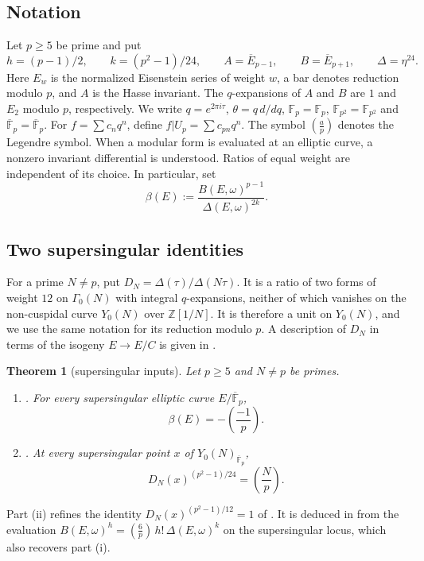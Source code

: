 \documentclass[11pt,a4paper]{article}
\numberwithin{equation}{section}
\newtheorem{theorem}{Theorem}[section]
\theoremstyle{definition}
\theoremstyle{remark}
\newcommand{\Fp}{\mathbb F_p}
\newcommand{\Fq}{\mathbb F_{p^2}}
\newcommand{\Fb}{\overline{\mathbb F}_p}
\newcommand{\Z}{\mathbb Z}
\newcommand{\Lp}[1]{\left(\frac{#1}{p}\right)}
\begin{document}
\subsection{Notation}
Let $p\ge5$ be prime and put
\[
h=(p-1)/2,\qquad k=(p^2-1)/24,\qquad
A=\overline E_{p-1},\qquad B=\overline E_{p+1},\qquad
\Delta=\eta^{24}.
\]
Here $E_w$ is the normalized Eisenstein series of weight $w$, a bar
denotes reduction modulo $p$, and $A$ is the Hasse invariant. The
$q$-expansions of $A$ and $B$ are $1$ and $E_2$ modulo $p$,
respectively. We write $q=e^{2\pi i\tau}$, $\theta=q\,d/dq$,
$\Fp=\mathbb F_p$, $\Fq=\mathbb F_{p^2}$ and
$\Fb=\overline{\mathbb F}_p$.
For $f=\sum c_nq^n$, define $f|U_p=\sum c_{pn}q^n$.
The symbol $\left(\frac{a}{p}\right)$ denotes the Legendre symbol.
When a modular form is evaluated at an elliptic curve, a nonzero
invariant differential is understood. Ratios of equal weight are
independent of its choice. In particular, set
\[
\beta(E):=\frac{B(E,\omega)^{p-1}}{\Delta(E,\omega)^{2k}}.
\]

\subsection{Two supersingular identities}
For a prime $N\ne p$, put $D_N=\Delta(\tau)/\Delta(N\tau)$. It is a ratio
of two forms of weight $12$ on $\Gamma_0(N)$ with integral $q$-expansions,
neither of which vanishes on the non-cuspidal curve $Y_0(N)$ over
$\Z[1/N]$. It is therefore a unit on $Y_0(N)$, and we use the same
notation for its reduction modulo $p$. A description of $D_N$ in terms of
the isogeny $E\to E/C$ is given in \citet{JordanFactorial}.

\begin{theorem}[supersingular inputs]\label{thm:input}
Let $p\ge5$ and $N\ne p$ be primes.
\begin{enumerate}[label=\textup{(\roman*)}]
\item \textup{\citep[Theorem~1.4]{Baker98}.} For every supersingular elliptic
curve $E/\Fb$,
\[
\beta(E)=-\Lp{-1}.
\]
\item \textup{\citep[Theorem~1.3]{JordanFactorial}.} At every supersingular
point $x$ of $Y_0(N)_{\Fb}$,
\[
D_N(x)^{(p^2-1)/24}=\Lp N.
\]
\end{enumerate}
\end{theorem}

Part (ii) refines the identity $D_N(x)^{(p^2-1)/12}=1$ of
\citet[Theorem~1.2]{Ono25}. It is deduced in \citet{JordanFactorial} from
the evaluation $B(E,\omega)^h=\Lp6\,h!\,\Delta(E,\omega)^k$ on the
supersingular locus, which also recovers part (i).
\end{document}
